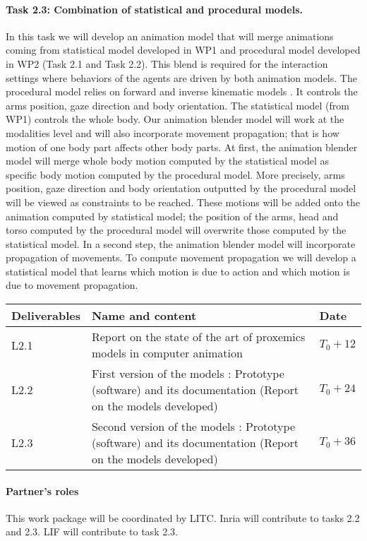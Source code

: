\paragraph{Task 2.3:  Combination of statistical and procedural models.}

In this task we will develop an animation model that will merge animations coming from statistical model developed in WP1 and procedural model developed in WP2 (Task 2.1 and Task 2.2). This blend is required for the interaction settings where behaviors of the agents are driven by both animation models.  The procedural model relies on forward and inverse kinematic models \cite{huang:2012:EET}. It controls the arms position, gaze direction and body orientation. The statistical model (from WP1) controls the whole body.  Our animation blender model will work at the modalities level and will also incorporate movement propagation; that is how motion of one body part affects other body parts. At first, the animation blender model will merge whole body motion computed by the statistical model as specific body motion computed by the procedural model. More precisely, arms position, gaze direction and body orientation outputted by the procedural model will be viewed as constraints to be reached. These motions will be 
added onto the animation computed by statistical model; the position of the arms, head and torso computed by the procedural model will overwrite those computed by the statistical model. In a second step, the animation blender model will incorporate propagation of movements. To compute movement propagation we will develop a statistical model that learns which motion is due to action and which motion is due to movement propagation.

\vspace{5mm}

\begin{tabular}{|l|p{10cm}|l|}\hline
Deliverables & Name and content  & Date  \\\hline
L2.1  & Report on the state of the art of proxemics models in computer animation&   $T_0+12$  \\\hline
L2.2  &  First version of the models : Prototype (software) and its documentation (Report on the models developed) & $T_0+24$ \\\hline
L2.3  &  Second version of the models : Prototype (software) and its documentation (Report on the models developed) &  $T_0+36$ \\\hline
\end{tabular}

\paragraph{Partner's roles} This work package  will be coordinated by LITC. Inria  will contribute to tasks 2.2 and 2.3. LIF will contribute to task 2.3.
 
\endinput
